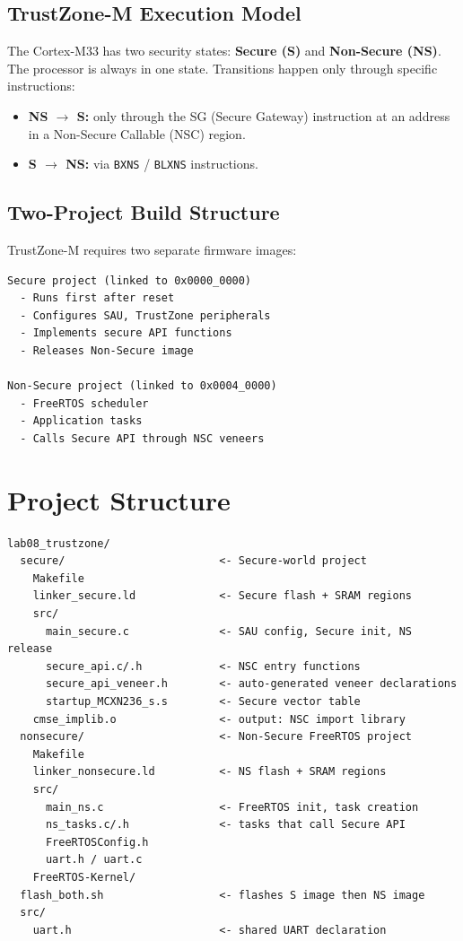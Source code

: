 \documentclass[11pt, a4paper]{article}
\begin{document}
\subsection{TrustZone-M Execution Model}

The Cortex-M33 has two security states: \textbf{Secure (S)} and \textbf{Non-Secure (NS)}.
The processor is always in one state. Transitions happen only through specific instructions:

\begin{itemize}[noitemsep, leftmargin=*]
  \item \textbf{NS $\to$ S:} only through the SG (Secure Gateway) instruction at an address
        in a Non-Secure Callable (NSC) region.
  \item \textbf{S $\to$ NS:} via \texttt{BXNS} / \texttt{BLXNS} instructions.
\end{itemize}

\subsection{Two-Project Build Structure}

TrustZone-M requires two separate firmware images:

\begin{lstlisting}[style=textstyle]
Secure project (linked to 0x0000_0000)
  - Runs first after reset
  - Configures SAU, TrustZone peripherals
  - Implements secure API functions
  - Releases Non-Secure image

Non-Secure project (linked to 0x0004_0000)
  - FreeRTOS scheduler
  - Application tasks
  - Calls Secure API through NSC veneers
\end{lstlisting}

\section{Project Structure}

\begin{lstlisting}[style=textstyle]
lab08_trustzone/
  secure/                        <- Secure-world project
    Makefile
    linker_secure.ld             <- Secure flash + SRAM regions
    src/
      main_secure.c              <- SAU config, Secure init, NS release
      secure_api.c/.h            <- NSC entry functions
      secure_api_veneer.h        <- auto-generated veneer declarations
      startup_MCXN236_s.s        <- Secure vector table
    cmse_implib.o                <- output: NSC import library
  nonsecure/                     <- Non-Secure FreeRTOS project
    Makefile
    linker_nonsecure.ld          <- NS flash + SRAM regions
    src/
      main_ns.c                  <- FreeRTOS init, task creation
      ns_tasks.c/.h              <- tasks that call Secure API
      FreeRTOSConfig.h
      uart.h / uart.c
    FreeRTOS-Kernel/
  flash_both.sh                  <- flashes S image then NS image
  src/
    uart.h                       <- shared UART declaration
\end{lstlisting}
\end{document}
